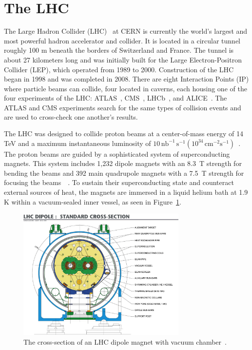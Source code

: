 \label{ch:Experimental_Apparatus}

\section{The LHC}
\label{the_lhc}

The Large Hadron Collider (LHC)~\cite{Bruning:782076} at CERN is currently the world's largest and most powerful hadron accelerator and collider.
It is located in a circular tunnel roughly 100 m beneath the borders of Switzerland and France. The tunnel is about 27 kilometers long and was initially built for the Large Electron-Positron Collider (LEP), which operated from 1989 to 2000. Construction of the LHC began in 1998 and was completed in 2008. There are eight Interaction Points (IP) where particle beams can collide, four located in caverns, each housing one of the four experiments of the LHC: ATLAS~\cite{TheATLASCollaboration_2008}, CMS~\cite{TheCMSCollaboration_2008}, LHCb~\cite{TheLHCbCollaboration_2008}, and ALICE~\cite{TheALICECollaboration_2008}.
The ATLAS and CMS experiments search for the same types of collision events and are used to cross-check one another’s results.

The LHC was designed to collide proton beams at a center-of-mass energy of 14 TeV and a maximum instantaneous luminosity of 
$10 \, \mathrm{nb}^{-1} \, \mathrm{s}^{-1} (10^{34} \, \mathrm{cm}^{-2}\mathrm{s}^{-1})$~\cite{LyndonEvans_2008}.
The proton beams are guided by a sophisticated system of superconducting magnets. This system includes 1,232 dipole magnets with an \SI{8.3}{\tesla} strength for bending the beams and 392 main quadrupole magnets with a \SI{7.5}{\tesla} strength for focusing the beams~\cite{1288863}~\cite{1324760}.
To sustain their superconducting state and counteract external sources of heat, the magnets are immersed in a liquid helium bath at 1.9 K within a vacuum-sealed inner vessel, as seen in Figure~\ref{fig:lhc_dipole}.

\begin{figure}[ht]
    \centering
    \includegraphics[width=0.75\textwidth]{figures/LHC/LHC_dipole.jpg}
    \caption[]{The cross-section of an LHC dipole magnet with vacuum chamber~\cite{Team:40524}.}
    \label{fig:lhc_dipole}
\end{figure}

